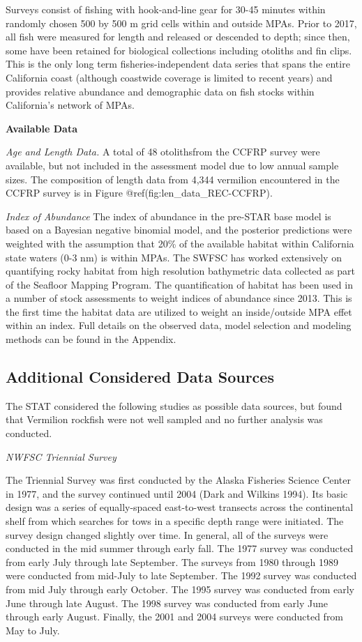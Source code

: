 \documentclass[
  english,
  a4paper,
]{article}
\begin{document}
Surveys consist of fishing with hook-and-line gear for 30-45 minutes within
randomly chosen 500 by 500 m grid cells within and outside MPAs.
Prior to 2017, all fish were measured for length and released or descended to depth;
since then, some have been retained for biological collections including otoliths and fin clips.
This is the only long term fisheries-independent data series that spans the entire California
coast (although coastwide coverage is limited to recent years) and provides relative abundance and demographic data on fish stocks within California's network of MPAs.

\textbf{Available Data}

\emph{Age and Length Data.} A total of 48 otolithsfrom the CCFRP survey were available, but not included in the
assessment model due to low
annual sample sizes. The composition of length data from 4,344 vermilion encountered
in the CCFRP survey is in Figure @ref(fig:len\_data\_REC-CCFRP).

\emph{Index of Abundance}
The index of abundance in the pre-STAR base model is based on a Bayesian negative binomial
model, and the posterior predictions were weighted with the assumption that 20\% of
the available habitat within California state waters (0-3 nm) is within MPAs.
The SWFSC has worked extensively on quantifying rocky habitat from high resolution
bathymetric data collected as part of the Seafloor Mapping Program. The quantification
of habitat has been used in a number of stock assessments to weight indices of abundance
since 2013. This is the first time the habitat data are utilized to weight an inside/outside
MPA effet within an index. Full details on the observed data, model selection and modeling
methods can be found in the Appendix.

\hypertarget{additional-considered-data-sources}{%
\subsection{Additional Considered Data Sources}\label{additional-considered-data-sources}}

The STAT considered the following studies as possible data sources, but found that Vermilion rockfish were not well sampled and no further analysis was conducted.

\emph{NWFSC Triennial Survey}

The Triennial Survey was first conducted by the Alaska Fisheries Science Center in 1977, and the survey
continued until 2004 (Dark and Wilkins 1994).
Its basic design was a series of equally-spaced east-to-west transects across
the continental shelf from which searches for tows in a specific depth range were initiated.
The survey design changed slightly over time.
In general, all of the surveys were conducted in the mid summer through early fall.
The 1977 survey was conducted from early July through late September.
The surveys from 1980 through 1989 were conducted from mid-July to late September.
The 1992 survey was conducted from mid July through early October.
The 1995 survey was conducted from early June through late August.
The 1998 survey was conducted from early June through early August.
Finally, the 2001 and 2004 surveys were conducted from May to July.
\end{document}
